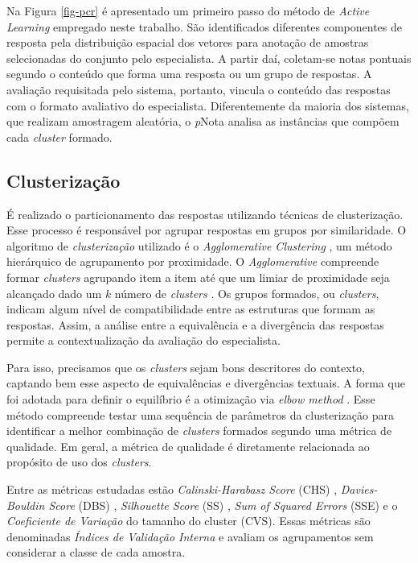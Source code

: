 Na Figura \ref{fig-pcr} é apresentado um primeiro passo do método de \textit{Active Learning} empregado neste trabalho. São identificados diferentes componentes de resposta pela distribuição espacial dos vetores para anotação de amostras selecionadas do conjunto pelo especialista. A partir daí, coletam-se notas pontuais segundo o conteúdo que forma uma resposta ou um grupo de respostas. A avaliação requisitada pelo sistema, portanto, vincula o conteúdo das respostas com o formato avaliativo do especialista. Diferentemente da maioria dos sistemas, que realizam amostragem aleatória, o \textit{p}Nota analisa as instâncias que compõem cada \textit{cluster} formado.


\subsection{Clusterização}
\label{subsec-clusterizacao}

É realizado o particionamento das respostas utilizando técnicas de clusterização. Esse processo é responsável por agrupar respostas em grupos por similaridade. O algoritmo de \textit{clusterização} utilizado é o \textit{Agglomerative Clustering} \cite{spalenza2019}, um método hierárquico de agrupamento por proximidade. O \textit{Agglomerative} compreende formar \textit{clusters} agrupando item a item até que um limiar de proximidade seja alcançado dado um $ k $ número de \textit{clusters} \cite{everitt2011}. Os grupos formados, ou \textit{clusters}, indicam algum nível de compatibilidade entre as estruturas que formam as respostas. Assim, a análise entre a equivalência e a divergência das respostas permite a contextualização da avaliação do especialista.

Para isso, precisamos que os \textit{clusters} sejam bons descritores do contexto, captando bem esse aspecto de equivalências e divergências textuais. A forma que foi adotada para definir o equilíbrio é a otimização via \textit{elbow method} \cite{everitt2011}. Esse método compreende testar uma sequência de parâmetros da clusterização para identificar a melhor combinação de \textit{clusters} formados segundo uma métrica de qualidade. Em geral, a métrica de qualidade é diretamente relacionada ao propósito de uso dos \textit{clusters}.

Entre as métricas estudadas estão \textit{Calinski-Harabasz Score} (CHS) \cite{calinskiharabasz1974}, \textit{Davies-Bouldin Score} (DBS) \cite{daviesbouldin1979}, \textit{Silhouette Score} (SS) \cite{rousseeuw1987}, \textit{Sum of Squared Errors} (SSE) \cite{maimon2005} e o \textit{Coeficiente de Variação} do tamanho do cluster (CVS). Essas métricas são denominadas \textit{Índices de Validação Interna} e avaliam os agrupamentos sem considerar a classe de cada amostra.

